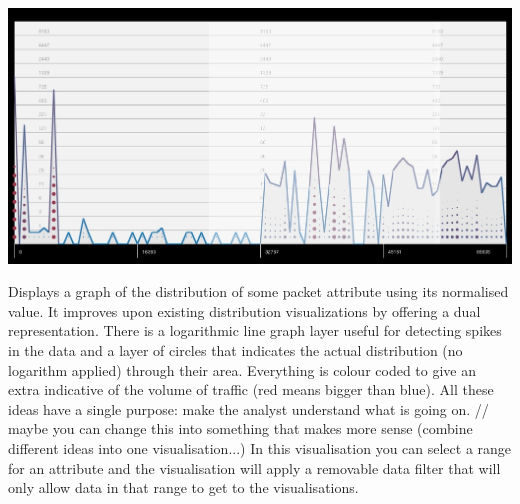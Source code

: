 \includegraphics[width=\linewidth]{materials/distribution.jpg}

Displays a graph of the distribution of some packet attribute using its normalised value.
It improves upon existing distribution visualizations by offering a dual representation.
There is a logarithmic line graph layer useful for detecting spikes in the data and a layer of circles that indicates the actual distribution (no logarithm applied) through their area. 
Everything is colour coded to give an extra indicative of the volume of traffic (red means bigger than blue).
All these ideas have a single purpose: make the analyst understand what is going on. // maybe you can change this into something that makes more sense (combine different ideas into one visualisation...)
In this visualisation you can select a range for an attribute and the visualisation will apply a removable data filter that will only allow data in that range to get to the visualisations.
